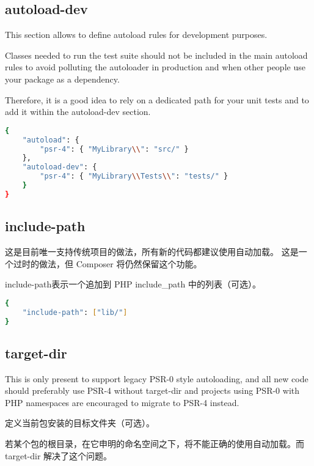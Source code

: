 \subsection{autoload-dev}

This section allows to define autoload rules for development purposes.

Classes needed to run the test suite should not be included in the main autoload rules to avoid polluting the autoloader in production and when other people use your package as a dependency.

Therefore, it is a good idea to rely on a dedicated path for your unit tests and to add it within the autoload-dev section.




\begin{lstlisting}[language=bash]
{
    "autoload": {
        "psr-4": { "MyLibrary\\": "src/" }
    },
    "autoload-dev": {
        "psr-4": { "MyLibrary\\Tests\\": "tests/" }
    }
}
\end{lstlisting}


\subsection{include-path}

这是目前唯一支持传统项目的做法，所有新的代码都建议使用自动加载。 这是一个过时的做法，但 Composer 将仍然保留这个功能。

include-path表示一个追加到 PHP include\_path 中的列表（可选）。


\begin{lstlisting}[language=bash]
{
    "include-path": ["lib/"]
}
\end{lstlisting}

\subsection{target-dir}

This is only present to support legacy PSR-0 style autoloading, and all new code should preferably use PSR-4 without target-dir and projects using PSR-0 with PHP namespaces are encouraged to migrate to PSR-4 instead.

定义当前包安装的目标文件夹（可选）。

若某个包的根目录，在它申明的命名空间之下，将不能正确的使用自动加载。而 target-dir 解决了这个问题。

